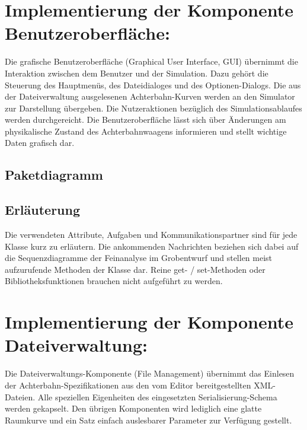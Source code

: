 
\section{Implementierung der Komponente Benutzeroberfläche:}

Die grafische Benutzeroberfläche (Graphical User Interface, GUI) übernimmt 
die Interaktion zwischen dem Benutzer und der Simulation.
Dazu gehört die Steuerung des Hauptmenüs, des Dateidialoges und
des Optionen-Dialogs. Die aus der Dateiverwaltung ausgelesenen Achterbahn-Kurven 
werden an den Simulator zur Darstellung übergeben. Die Nutzeraktionen bezüglich des
Simulationsablaufes werden durchgereicht. Die Benutzeroberfläche lässt sich über
Änderungen am physikalische Zustand des Achterbahnwaagens informieren und stellt
wichtige Daten grafisch dar.

\subsection{Paketdiagramm}
\subsection{Erläuterung}

Die verwendeten Attribute, Aufgaben und Kommunikationspartner sind für jede
Klasse kurz zu erläutern. Die ankommenden Nachrichten beziehen sich dabei auf
die Sequenzdiagramme der Feinanalyse im Grobentwurf und stellen meist
aufzurufende Methoden der Klasse dar.  Reine get- / set-Methoden oder
Bibliotheksfunktionen brauchen nicht aufgeführt zu werden.

\section{Implementierung der Komponente Dateiverwaltung:}

Die Dateiverwaltungs-Komponente (File Management) übernimmt das Einlesen der
Achterbahn-Spezifikationen aus den vom Editor bereitgestellten XML-Dateien. 
Alle speziellen Eigenheiten des eingesetzten Serialisierung-Schema werden gekapselt.
Den übrigen Komponenten wird lediglich eine glatte Raumkurve und ein Satz einfach 
auslesbarer Parameter zur Verfügung gestellt.

